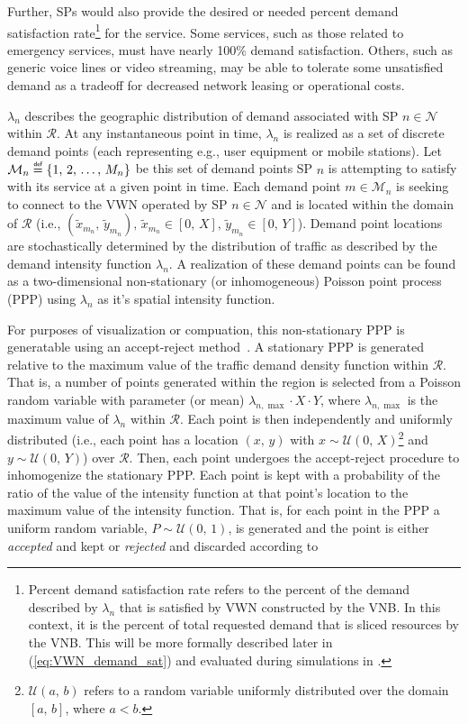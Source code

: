 \documentclass[12pt,dvipsnames]{report}
\newcommand\defeq{\mathrel{\overset{\makebox[0pt]{\mbox{\normalfont\tiny\sffamily def}}}{=}}}
\begin{document}
Further, SPs would also provide the desired or needed percent demand satisfaction rate\footnote{Percent demand satisfaction rate refers to the percent of the demand described by $\lambda_n$ that is satisfied by VWN constructed by the VNB.  In this context, it is the percent of total requested demand that is sliced resources by the VNB.  This will be more formally described later in  (\cref{eq:VWN_demand_sat}) and evaluated during simulations in .} for the service.  Some services, such as those related to emergency services, must have nearly 100\% demand satisfaction.  Others, such as generic voice lines or video streaming, may be able to tolerate some unsatisfied demand as a tradeoff for decreased network leasing or operational costs.

$\lambda_n$ describes the geographic distribution of demand associated with SP $n \in \mathcal{N}$ within $\mathcal{R}$.  At any instantaneous point in time, $\lambda_n$ is realized as a set of discrete demand points (each representing e.g., user equipment or mobile stations).  Let $\mathcal{M}_n \defeq \left\{1,\, 2,\, \ldots,\, M_n\right\}$ be this set of demand points SP $n$ is attempting to satisfy with its service at a given point in time.  Each demand point $m \in \mathcal{M}_n$ is seeking to connect to the VWN operated by SP $n \in \mathcal{N}$ and is located within the domain of $\mathcal{R}$ (i.e., $\left( \tilde{x}_{m_n},\, \tilde{y}_{m_n} \right),\, \tilde{x}_{m_n} \in \left[ 0,\, X \right],\, \tilde{y}_{m_n} \in \left[ 0,\, Y \right]$).  Demand point locations are stochastically determined by the distribution of traffic as described by the demand intensity function $\lambda_n$.  A realization of these demand points can be found as a two-dimensional non-stationary (or inhomogeneous) Poisson point process (PPP) using $\lambda_n$ as it's spatial intensity function.

For purposes of visualization or compuation, this non-stationary PPP is generatable using an accept-reject method~\cite{leeds:nsPPPgeneration}.  A stationary PPP is generated relative to the maximum value of the traffic demand density function within $\mathcal{R}$.  That is, a number of points generated within the region is selected from a Poisson random variable with parameter (or mean) $\lambda_{n,\max} \cdot X \cdot Y$, where $\lambda_{n,\max}$ is the maximum value of $\lambda_n$ within $\mathcal{R}$.  Each point is then independently and uniformly distributed (i.e., each point has a location $\left( x,\, y \right)$ with $x \sim \mathcal{U}\left( 0,\, X \right)$\footnote{$\mathcal{U}\left( a,\, b \right)$ refers to a random variable uniformly distributed over the domain $\left[ a,\, b \right]$, where $a < b$.} and $y \sim \mathcal{U}\left( 0,\, Y \right)$) over $\mathcal{R}$.  Then, each point undergoes the accept-reject procedure to inhomogenize the stationary PPP.  Each point is kept with a probability of the ratio of the value of the intensity function at that point's location to the maximum value of the intensity function.  That is, for each point in the PPP a uniform random variable, $P \sim \mathcal{U}\left( 0,\, 1 \right)$, is generated and the point is either \emph{accepted} and kept or \emph{rejected} and discarded according to
\end{document}

